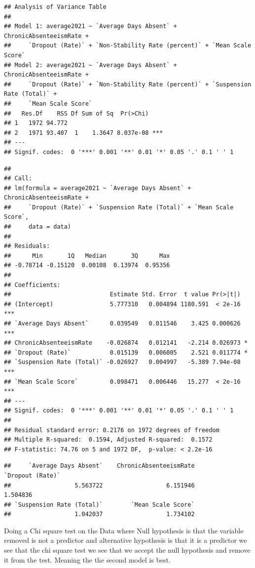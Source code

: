 \documentclass[
]{article}
\begin{document}
\begin{verbatim}
## Analysis of Variance Table
## 
## Model 1: average2021 ~ `Average Days Absent` + ChronicAbsenteeismRate + 
##     `Dropout (Rate)` + `Non-Stability Rate (percent)` + `Mean Scale Score`
## Model 2: average2021 ~ `Average Days Absent` + ChronicAbsenteeismRate + 
##     `Dropout (Rate)` + `Non-Stability Rate (percent)` + `Suspension Rate (Total)` + 
##     `Mean Scale Score`
##   Res.Df    RSS Df Sum of Sq  Pr(>Chi)    
## 1   1972 94.772                           
## 2   1971 93.407  1    1.3647 8.037e-08 ***
## ---
## Signif. codes:  0 '***' 0.001 '**' 0.01 '*' 0.05 '.' 0.1 ' ' 1
\end{verbatim}

\begin{verbatim}
## 
## Call:
## lm(formula = average2021 ~ `Average Days Absent` + ChronicAbsenteeismRate + 
##     `Dropout (Rate)` + `Suspension Rate (Total)` + `Mean Scale Score`, 
##     data = data)
## 
## Residuals:
##      Min       1Q   Median       3Q      Max 
## -0.78714 -0.15120  0.00108  0.13974  0.95356 
## 
## Coefficients:
##                            Estimate Std. Error  t value Pr(>|t|)    
## (Intercept)                5.777310   0.004894 1180.591  < 2e-16 ***
## `Average Days Absent`      0.039549   0.011546    3.425 0.000626 ***
## ChronicAbsenteeismRate    -0.026874   0.012141   -2.214 0.026973 *  
## `Dropout (Rate)`           0.015139   0.006005    2.521 0.011774 *  
## `Suspension Rate (Total)` -0.026927   0.004997   -5.389 7.94e-08 ***
## `Mean Scale Score`         0.098471   0.006446   15.277  < 2e-16 ***
## ---
## Signif. codes:  0 '***' 0.001 '**' 0.01 '*' 0.05 '.' 0.1 ' ' 1
## 
## Residual standard error: 0.2176 on 1972 degrees of freedom
## Multiple R-squared:  0.1594, Adjusted R-squared:  0.1572 
## F-statistic: 74.76 on 5 and 1972 DF,  p-value: < 2.2e-16
\end{verbatim}

\begin{verbatim}
##     `Average Days Absent`    ChronicAbsenteeismRate          `Dropout (Rate)` 
##                  5.563722                  6.151946                  1.504836 
## `Suspension Rate (Total)`        `Mean Scale Score` 
##                  1.042037                  1.734102
\end{verbatim}

Doing a Chi square test on the Data where Null hypothesis is that the
variable removed is not a predictor and alternative hypothesis is that
it is a predictor we see that the chi square test we see that we accept
the null hypothesis and remove it from the test. Meaning the the second
model is best.
\end{document}
